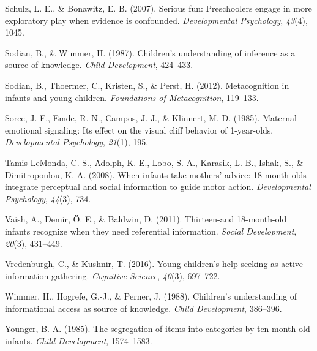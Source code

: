 \documentclass[floatsintext,man]{apa6}
\theoremstyle{definition}
\theoremstyle{definition}
\theoremstyle{definition}
\theoremstyle{remark}
\begin{document}
\hypertarget{ref-schulz2007serious}{}
Schulz, L. E., \& Bonawitz, E. B. (2007). Serious fun: Preschoolers
engage in more exploratory play when evidence is confounded.
\emph{Developmental Psychology}, \emph{43}(4), 1045.

\hypertarget{ref-sodian1987children}{}
Sodian, B., \& Wimmer, H. (1987). Children's understanding of inference
as a source of knowledge. \emph{Child Development}, 424--433.

\hypertarget{ref-sodian2012metacognition}{}
Sodian, B., Thoermer, C., Kristen, S., \& Perst, H. (2012).
Metacognition in infants and young children. \emph{Foundations of
Metacognition}, 119--133.

\hypertarget{ref-sorce1985maternal}{}
Sorce, J. F., Emde, R. N., Campos, J. J., \& Klinnert, M. D. (1985).
Maternal emotional signaling: Its effect on the visual cliff behavior of
1-year-olds. \emph{Developmental Psychology}, \emph{21}(1), 195.

\hypertarget{ref-tamis2008infants}{}
Tamis-LeMonda, C. S., Adolph, K. E., Lobo, S. A., Karasik, L. B., Ishak,
S., \& Dimitropoulou, K. A. (2008). When infants take mothers' advice:
18-month-olds integrate perceptual and social information to guide motor
action. \emph{Developmental Psychology}, \emph{44}(3), 734.

\hypertarget{ref-vaish2011thirteen}{}
Vaish, A., Demir, Ö. E., \& Baldwin, D. (2011). Thirteen-and
18-month-old infants recognize when they need referential information.
\emph{Social Development}, \emph{20}(3), 431--449.

\hypertarget{ref-vredenburgh2016young}{}
Vredenburgh, C., \& Kushnir, T. (2016). Young children's help-seeking as
active information gathering. \emph{Cognitive Science}, \emph{40}(3),
697--722.

\hypertarget{ref-wimmer1988children}{}
Wimmer, H., Hogrefe, G.-J., \& Perner, J. (1988). Children's
understanding of informational access as source of knowledge.
\emph{Child Development}, 386--396.

\hypertarget{ref-younger1985segregation}{}
Younger, B. A. (1985). The segregation of items into categories by
ten-month-old infants. \emph{Child Development}, 1574--1583.
\end{document}
